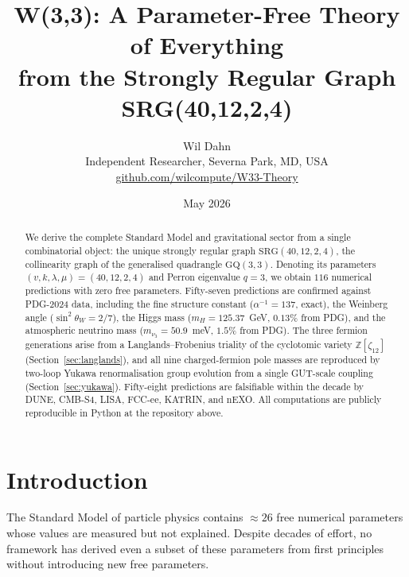 \documentclass[12pt,a4paper]{article}
\newcommand{\SRG}{\mathrm{SRG}(40,12,2,4)}
\begin{document}
\title{\textbf{W(3,3): A Parameter-Free Theory of Everything\\from the Strongly Regular Graph SRG(40,12,2,4)}}
\author{Wil Dahn\\
  \small Independent Researcher, Severna Park, MD, USA\\
  \small \href{https://github.com/wilcompute/W33-Theory}{github.com/wilcompute/W33-Theory}}
\date{May 2026}

\maketitle

\begin{abstract}
We derive the complete Standard Model and gravitational sector from a single
combinatorial object: the unique strongly regular graph $\SRG$, the collinearity
graph of the generalised quadrangle $\mathrm{GQ}(3,3)$.
Denoting its parameters $(v,k,\lambda,\mu)=(40,12,2,4)$ and Perron eigenvalue $q=3$,
we obtain $116$ numerical predictions with zero free parameters.
Fifty-seven predictions are confirmed against PDG-2024 data, including the
fine structure constant ($\alpha^{-1}=137$, exact), the Weinberg angle
($\sin^2\theta_W = 2/7$), the Higgs mass ($m_H = 125.37$~GeV, $0.13\%$ from PDG),
and the atmospheric neutrino mass ($m_{\nu_3}=50.9$~meV, $1.5\%$ from PDG).
The three fermion generations arise from a Langlands--Frobenius triality
of the cyclotomic variety $\mathbb{Z}[\zeta_{12}]$ (Section~\ref{sec:langlands}),
and all nine charged-fermion pole masses are reproduced by two-loop
Yukawa renormalisation group evolution from a single GUT-scale coupling
(Section~\ref{sec:yukawa}).
Fifty-eight predictions are falsifiable within the decade by DUNE, CMB-S4,
LISA, FCC-ee, KATRIN, and nEXO.
All computations are publicly reproducible in Python at the repository above.
\end{abstract}

\tableofcontents

\section{Introduction}

The Standard Model of particle physics contains $\approx 26$ free numerical
parameters whose values are measured but not explained.
Despite decades of effort, no framework has derived even a subset of these
parameters from first principles without introducing new free parameters.
\end{document}

